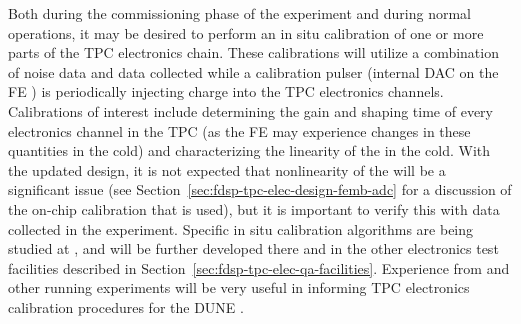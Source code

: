 Both during the commissioning phase of the experiment and during normal operations, it may
be desired to perform an in situ calibration of one or more parts of the TPC electronics chain.
These calibrations will utilize a combination of noise data and data collected while a
calibration pulser (internal DAC on the FE ) is periodically injecting charge into the TPC
electronics channels.  Calibrations of interest include determining the gain and shaping time of
every electronics channel in the TPC (as the FE  may experience changes in these quantities
in the cold) and characterizing the linearity of the   in the cold.  With the updated  
design, it is not expected that nonlinearity of the  will be a significant issue (see
Section~\ref{sec:fdsp-tpc-elec-design-femb-adc} for a discussion of the on-chip calibration
that is used), but it is important to verify this with data collected in the experiment.
Specific in situ calibration algorithms are being studied at , and will be further
developed there and in the other electronics test facilities described in
Section~\ref{sec:fdsp-tpc-elec-qa-facilities}.  Experience from \microboone and other running
\lartpc experiments will be very useful in informing TPC electronics calibration procedures for
the DUNE .
